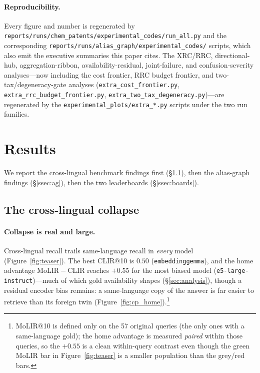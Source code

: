 \documentclass[11pt]{article}
\begin{document}
\paragraph{Reproducibility.}
Every figure and number is regenerated by
\texttt{reports/runs/chem\_patents/experimental\_codes/run\_all.py} and the
corresponding \texttt{reports/runs/alias\_graph/experimental\_codes/} scripts,
which also emit the executive summaries this paper cites. The XRC/RRC,
directional-hub, aggregation-ribbon, availability-residual, joint-failure, and
confusion-severity analyses---now including the cost frontier, RRC budget
frontier, and two-tax/degeneracy-gate analyses
(\texttt{extra\_cost\_frontier.py}, \texttt{extra\_rrc\_budget\_frontier.py},
\texttt{extra\_two\_tax\_degeneracy.py})---are regenerated by the
\texttt{experimental\_plots/extra\_*.py} scripts under the two run families.

\section{Results}
\label{sec:results}

We report the cross-lingual benchmark findings first (\S\ref{ssec:cp}), then
the alias-graph findings (\S\ref{ssec:ag}), then the two leaderboards
(\S\ref{ssec:boards}).

\subsection{The cross-lingual collapse}
\label{ssec:cp}

\paragraph{Collapse is real and large.}
Cross-lingual recall trails same-language recall in \emph{every} model
(Figure~\ref{fig:teaser}). The best CLIR@10 is $0.50$ (\texttt{embeddinggemma}),
and the home advantage $\mathrm{MoLIR}{-}\mathrm{CLIR}$ reaches $+0.55$ for the
most biased model (\texttt{e5-large-instruct})---much of which gold availability
shapes (\S\ref{sec:analysis}), though a residual encoder bias remains: a
same-language copy of the answer is far easier to retrieve than its foreign twin
(Figure~\ref{fig:cp_home}).\footnote{MoLIR@10 is defined only on the 57 original
queries (the only ones with a same-language gold); the home advantage is
measured \emph{paired} within those queries, so the $+0.55$ is a clean
within-query contrast even though the green MoLIR bar in Figure~\ref{fig:teaser}
is a smaller population than the grey/red bars.}
\end{document}
